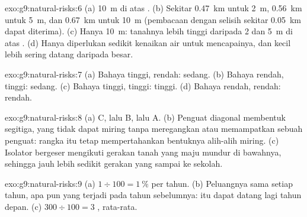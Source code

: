 \begin{solution}{exo:g9:natural-risks:6}
(a)  \qty{10}{m} di atas . (b) Sekitar \qty{0.47}{km} untuk
 \qty{2}{m}, \qty{0.56}{km} untuk  \qty{5}{m}, dan
\qty{0.67}{km} untuk  \qty{10}{m} (pembacaan dengan selisih sekitar
\qty{0.05}{km} dapat diterima). (c) Hanya  \qty{10}{m}: tanahnya
lebih tinggi daripada 2 dan \qty{5}{m} di atas . (d) Hanya
diperlukan sedikit kenaikan air  untuk mencapainya, dan  kecil
lebih sering datang daripada  besar.
\end{solution}

\begin{solution}{exo:g9:natural-risks:7}
(a) Bahaya tinggi,  rendah:  sedang. (b) Bahaya rendah,
 tinggi:  sedang. (c) Bahaya tinggi,  tinggi:
 tinggi. (d) Bahaya rendah,  rendah:  rendah.
\end{solution}

\begin{solution}{exo:g9:natural-risks:8}
(a) C, lalu B, lalu A. (b) Penguat diagonal membentuk segitiga, yang tidak
dapat miring tanpa meregangkan atau memampatkan sebuah penguat: rangka itu
tetap mempertahankan bentuknya alih-alih miring. (c) Isolator bergeser
mengikuti gerakan tanah yang maju mundur di bawahnya, sehingga jauh lebih
sedikit gerakan yang sampai ke sekolah.
\end{solution}

\begin{solution}{exo:g9:natural-risks:9}
(a) $1 \div 100 = 1~\%$ per tahun. (b) Peluangnya sama setiap tahun, apa
pun yang terjadi pada tahun sebelumnya:  itu dapat datang lagi
tahun depan. (c) $300 \div 100 = 3$ , rata-rata.
\end{solution}


